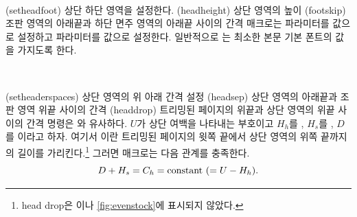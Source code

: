 \begin{syntax}
\cmd{\setheadfoot} \\
\end{syntax}
\glossary(setheadfoot)%
  {}%
  {상단 하단 영역을 설정한다.}
\glossary(headheight)%
  {}%
  {상단 영역의 높이}
\glossary(footskip)%
  {}%
  {조판 영역의 아래끝과 하단 면주 영역의 아래끝 사이의 간격}
\cmd{\setheadfoot} 매크로는 \lnc{\headheight} 파라미터를  값으로 설정하고 \lnc{\footskip} 파라미터를
 값으로 설정한다. 일반적으로 \lnc{\headheight}는
최소한 본문 기본 폰트의 \lnc{\baselineskip} 값을 가지도록 한다.


\begin{syntax}
\cmd{\setheaderspaces} \\
\end{syntax}
\glossary(setheaderspaces)%
  {}%
  {상단 영역의 위 아래 간격 설정}
\glossary(headsep)%
  {}%
  {상단 영역의 아래끝과 조판 영역 위끝 사이의 간격}
\glossary(headdrop)%
  {}%
  {트리밍된 페이지의 위끝과 상단 영역의 위끝 사이의 간격}
\cmd{\setheaderspaces} 명령은 \cmd{\setulmargins}와 유사하다.
$U$가 상단 여백을 나타내는 부호이고 $H_h$를 \lnc{\headheight},
$H_s$를 \lnc{\headsep}, $D$를 \lnc{\headdrop}이라고 하자.
여기서 \lnc{\headdrop}이란 트리밍된 페이지의 윗쪽 끝에서 상단 영역의
위쪽 끝까지의 길이를 가리킨다.\footnote{head drop은 이나
\ref{fig:evenstock}에 표시되지 않았다.}
그러면 \cmd{\setheaderspaces} 매크로는 다음 관계를 충족한다.
\begin{displaymath}
D + H_{s} = C_{h}  = \textrm{constant} \mbox{\space} (= U - H_{h}).
\end{displaymath}

